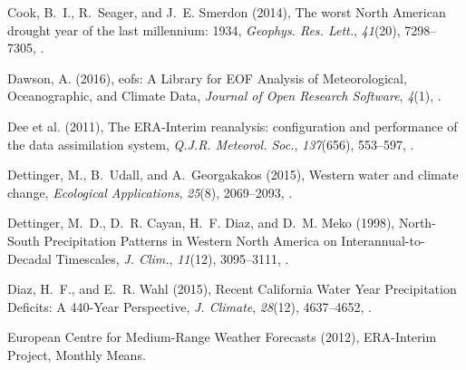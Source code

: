 \documentclass[final, double]{ua-thesis}
\begin{document}
\begin{thebibliography}{59}
Cook, B.~I., R.~Seager, and J.~E. Smerdon (2014), The worst {North} {American}
  drought year of the last millennium: 1934, \textit{Geophys. Res. Lett.},
  \textit{41}(20), 7298--7305, .

Dawson, A. (2016), eofs: {A} {Library} for {EOF} {Analysis} of
  {Meteorological}, {Oceanographic}, and {Climate} {Data}, \textit{Journal of
  Open Research Software}, \textit{4}(1), .

Dee et al. (2011), The {ERA}-{Interim}
  reanalysis: configuration and performance of the data assimilation system,
  \textit{Q.J.R. Meteorol. Soc.}, \textit{137}(656), 553--597,
  .
  
Dettinger, M., B.~Udall, and A.~Georgakakos (2015), Western water and climate
  change, \textit{Ecological Applications}, \textit{25}(8), 2069--2093,
  .
  
Dettinger, M.~D., D.~R. Cayan, H.~F. Diaz, and D.~M. Meko (1998),
  North-{South} {Precipitation} {Patterns} in {Western} {North} {America} on
  {Interannual}-to-{Decadal} {Timescales}, \textit{J. Clim.}, \textit{11}(12),
  3095--3111, .

Diaz, H.~F., and E.~R. Wahl (2015), Recent {California} {Water} {Year}
  {Precipitation} {Deficits}: {A} 440-{Year} {Perspective}, \textit{J.
  Climate}, \textit{28}(12), 4637--4652, .

{European Centre for Medium-Range Weather Forecasts} (2012), {ERA}-{Interim}
  {Project}, {Monthly} {Means}.


\end{thebibliography}
\end{document}
